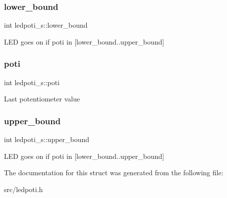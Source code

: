 \subsubsection{\texorpdfstring{lower\+\_\+bound}{lower\_bound}}
{\footnotesize\ttfamily int ledpoti\+\_\+s\+::lower\+\_\+bound}

L\+ED goes on if poti in \mbox{[}lower\+\_\+bound..upper\+\_\+bound\mbox{]} \mbox{\label{structledpoti__s_a68de5489c63aee62e5da18f9b4fe6fa9}} 
\subsubsection{\texorpdfstring{poti}{poti}}
{\footnotesize\ttfamily int ledpoti\+\_\+s\+::poti}

Last potentiometer value \mbox{\label{structledpoti__s_a13828b9c632c6ad2497be31aeeaa991b}} 
\subsubsection{\texorpdfstring{upper\+\_\+bound}{upper\_bound}}
{\footnotesize\ttfamily int ledpoti\+\_\+s\+::upper\+\_\+bound}

L\+ED goes on if poti in \mbox{[}lower\+\_\+bound..upper\+\_\+bound\mbox{]} 

The documentation for this struct was generated from the following file\+:\begin{DoxyCompactItemize}
\item 
src/ledpoti.\+h\end{DoxyCompactItemize}
